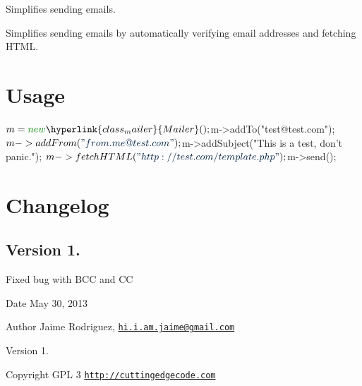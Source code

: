 Simplifies sending emails.

Simplifies sending emails by automatically verifying email addresses and fetching H\-T\-M\-L.\hypertarget{nav1_usage}{}\section{Usage}\label{nav1_usage}

\begin{DoxyCode}
$m = \textcolor{keyword}{new} \hyperlink{class_mailer}{Mailer}();
$m->addTo(\textcolor{stringliteral}{"test@test.com"});
$m->addFrom(\textcolor{stringliteral}{"from.me@test.com"});
$m->addSubject(\textcolor{stringliteral}{"This is a test, don't panic."});
$m->fetchHTML(\textcolor{stringliteral}{"http://test.com/template.php"});
$m->send();
\end{DoxyCode}
\hypertarget{nav1_changelog}{}\section{Changelog}\label{nav1_changelog}
\subsection*{Version 1.}


\begin{DoxyItemize}
\item Fixed bug with B\-C\-C and C\-C
\end{DoxyItemize}

\begin{DoxyDate}{Date}
May 30, 2013 
\end{DoxyDate}
\begin{DoxyAuthor}{Author}
Jaime Rodriguez, \href{mailto:hi.i.am.jaime@gmail.com}{\tt hi.\-i.\-am.\-jaime@gmail.\-com} 
\end{DoxyAuthor}
\begin{DoxyVersion}{Version}
1. 
\end{DoxyVersion}
\begin{DoxyCopyright}{Copyright}
G\-P\-L 3 \href{http://cuttingedgecode.com}{\tt http\-://cuttingedgecode.\-com} 
\end{DoxyCopyright}
